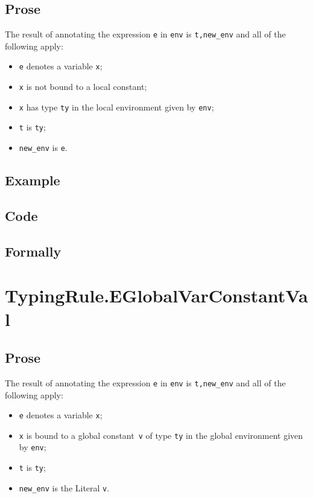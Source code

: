 \documentclass{book}
\begin{document}
  \subsection{Prose}
  The result of annotating the expression \texttt{e} in \texttt{env} is
\texttt{t,new\_env} and all of the following apply: 
  \begin{itemize}
  \item \texttt{e} denotes a variable \texttt{x};
  \item \texttt{x} is not bound to a local constant; 
  \item \texttt{x} has type \texttt{ty} in the local environment given by \texttt{env};
  \item \texttt{t} is \texttt{ty};
  \item \texttt{new\_env} is \texttt{e}.
  \end{itemize}

  \subsection{Example}

  \subsection{Code}

\begin{emptyformal}
  \subsection{Formally}
\end{emptyformal}


\section{TypingRule.EGlobalVarConstantVal \label{sec:TypingRule.EGlobalVarConstant}}

  \subsection{Prose}
  The result of annotating the expression \texttt{e} in \texttt{env} is
\texttt{t,new\_env} and all of the following apply: 
  \begin{itemize}
  \item \texttt{e} denotes a variable \texttt{x};
  \item \texttt{x} is bound to a global constant~\texttt{v} of type \texttt{ty} in the global environment given by \texttt{env};
  \item \texttt{t} is \texttt{ty};
  \item \texttt{new\_env} is the Literal \texttt{v}.
  \end{itemize}
\end{document}
